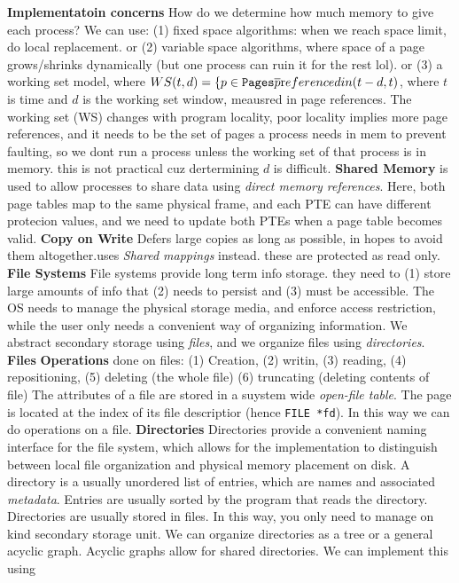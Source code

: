 {\bf Implementatoin concerns} How do we determine how much memory to give each
process? We can use: (1) fixed space algorithms: when we reach space limit, do
local replacement. or (2) variable space algorithms, where space of a page
grows/shrinks dynamically (but one process can ruin it for the rest lol). or
(3) a working set model, where $WS(t,d) = \{ p \in {\tt Pages} \bar p {\text
referenced in } (t-d, t)$, where $t$ is time and $d$ is the working set window,
meausred in page references. The working set (WS) changes with program
locality, poor locality implies more page references, and it needs to be the
set of pages a process needs in mem to prevent faulting, so we dont run a
process unless the working set of that process is in memory. this is not
practical cuz dertermining $d$ is difficult.  {\bf Shared Memory} is used to
allow processes to share data using \emph{direct memory references}.  Here,
both page tables map to the same physical frame, and each PTE can have
different protecion values, and we need to update both PTEs when a page table
becomes valid.
{\bf Copy on Write}
Defers large copies as long as possible, in hopes to avoid them
altogether.uses   \emph{Shared mappings} instead. these are protected as read only.
{\bf File Systems}
File systems provide long term info storage. they need to (1) store large amounts of info that (2) needs to persist and (3) must be accessible.
The OS needs to manage the physical storage media, and enforce access
restriction, while the user only needs a convenient way of organizing
information.
We abstract secondary storage using \emph{files}, and we organize files
using \emph{directories}.
{\bf Files}
{\bf Operations } done on files: (1) Creation, (2) writin, (3) reading, (4) repositioning, (5) deleting (the whole file) (6) truncating (deleting contents of file)
The attributes of a file are stored in a suystem wide \emph{open-file
table}. The page is located at the index of its file descriptior (hence
\texttt{FILE\ *fd}). In this way we can do operations on a file.
{\bf Directories}
Directories provide a convenient naming interface for the file system,
which allows for the implementation to distinguish between local file
organization and physical memory placement on disk.
A directory is a usually unordered list of entries, which are names and
associated \emph{metadata}. Entries are usually sorted by the program
that reads the directory.
Directories are usually stored in files. In this way, you only need to
manage on kind secondary storage unit.
We can organize directories as a tree or a general acyclic graph.
Acyclic graphs allow for shared directories. We can implement this using
